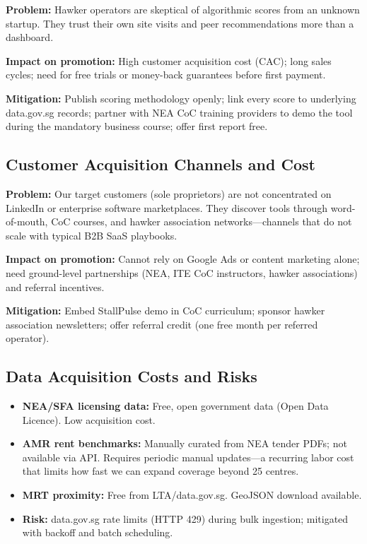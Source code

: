 \documentclass[11pt,a4paper]{article}
\begin{document}
\textbf{Problem:} Hawker operators are skeptical of algorithmic scores from an unknown startup. They trust their own site visits and peer recommendations more than a dashboard.

\textbf{Impact on promotion:} High customer acquisition cost (CAC); long sales cycles; need for free trials or money-back guarantees before first payment.

\textbf{Mitigation:} Publish scoring methodology openly; link every score to underlying data.gov.sg records; partner with NEA CoC training providers to demo the tool during the mandatory business course; offer first report free.

\subsection{Customer Acquisition Channels and Cost}

\textbf{Problem:} Our target customers (sole proprietors) are not concentrated on LinkedIn or enterprise software marketplaces. They discover tools through word-of-mouth, CoC courses, and hawker association networks---channels that do not scale with typical B2B SaaS playbooks.

\textbf{Impact on promotion:} Cannot rely on Google Ads or content marketing alone; need ground-level partnerships (NEA, ITE CoC instructors, hawker associations) and referral incentives.

\textbf{Mitigation:} Embed StallPulse demo in CoC curriculum; sponsor hawker association newsletters; offer referral credit (one free month per referred operator).

\subsection{Data Acquisition Costs and Risks}

\begin{itemize}
  \item \textbf{NEA/SFA licensing data:} Free, open government data (Open Data Licence). Low acquisition cost.
  \item \textbf{AMR rent benchmarks:} Manually curated from NEA tender PDFs; not available via API. Requires periodic manual updates---a recurring labor cost that limits how fast we can expand coverage beyond 25 centres.
  \item \textbf{MRT proximity:} Free from LTA/data.gov.sg. GeoJSON download available.
  \item \textbf{Risk:} data.gov.sg rate limits (HTTP 429) during bulk ingestion; mitigated with backoff and batch scheduling.
\end{itemize}
\end{document}
